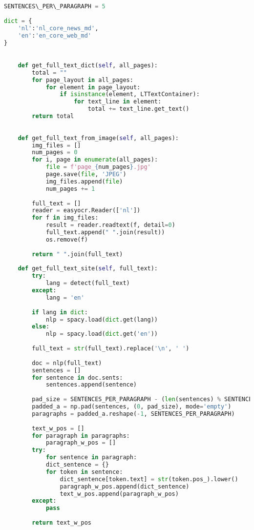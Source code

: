 \chapter{}%
\label{ch:bijlage-code-2}


\begin{lstlisting}[language=Python, caption={Reader-klasse}, label={code:reader-klasse}]
SENTENCES\_PER\_PARAGRAPH = 5
	
dict = {
	'nl':'nl_core_news_md',
	'en':'en_core_web_md'
}
	

	def get_full_text_dict(self, all_pages):
		total = ""
		for page_layout in all_pages:
			for element in page_layout:
				if isinstance(element, LTTextContainer):
					for text_line in element:
						total += text_line.get_text()
		return total
	
	
	def get_full_text_from_image(self, all_pages):
		img_files = []
		num_pages = 0
		for i, page in enumerate(all_pages):
			file = f'page_{num_pages}.jpg'
			page.save(file, 'JPEG')
			img_files.append(file)
			num_pages += 1
		
		full_text = []
		reader = easyocr.Reader(['nl'])
		for f in img_files:
			result = reader.readtext(f, detail=0)
			full_text.append(" ".join(result))
			os.remove(f)
		
		return " ".join(full_text)
	
	def get_full_text_site(self, full_text):
		try:
			lang = detect(full_text)
		except:
			lang = 'en'
	
		if lang in dict:
			nlp = spacy.load(dict.get(lang))
		else:
			nlp = spacy.load(dict.get('en'))
	
		full_text = str(full_text).replace('\n', ' ')
	
		doc = nlp(full_text)
		sentences = []
		for sentence in doc.sents:
			sentences.append(sentence)
	
		pad_size = SENTENCES_PER_PARAGRAPH - (len(sentences) % SENTENCES_PER_PARAGRAPH)
		padded_a = np.pad(sentences, (0, pad_size), mode='empty')
		paragraphs = padded_a.reshape(-1, SENTENCES_PER_PARAGRAPH)
	
		text_w_pos = []
		for paragraph in paragraphs:
			paragraph_w_pos = []
		try:
			for sentence in paragraph:
			dict_sentence = {}
			for token in sentence:
				dict_sentence[token.text] = str(token.pos_).lower()
				paragraph_w_pos.append(dict_sentence)    
				text_w_pos.append(paragraph_w_pos)
		except:
			pass
			
		return text_w_pos
\end{lstlisting}


